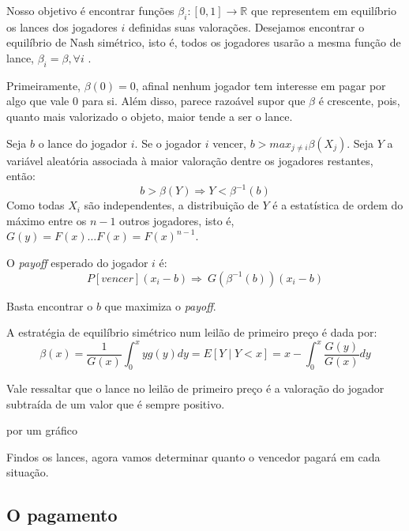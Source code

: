 Nosso objetivo é encontrar funções $\beta_i : [0, 1] \xrightarrow{} \mathbb{R}$ que representem em equilíbrio os lances dos jogadores $i$ definidas suas valorações. Desejamos encontrar o equilíbrio de Nash simétrico, isto é, todos os jogadores usarão a mesma função de lance, $\beta_i = \beta, \forall i$ \citet{krishna}.

Primeiramente, $\beta(0) = 0$, afinal nenhum jogador tem interesse em pagar por algo que vale 0 para si. Além disso, parece razoável supor que $\beta$ é crescente, pois, quanto mais valorizado o objeto, maior tende a ser o lance.

Seja $b$ o lance do jogador $i$. Se o jogador $i$ vencer, $b > max_{j \ne i} \beta(X_j)$. Seja $Y$ a variável aleatória associada à maior valoração dentre os jogadores restantes, então:
\begin{equation}
b > \beta(Y) \Rightarrow Y < \beta^{-1}(b)    
\end{equation}
Como todas $X_i$ são independentes, a distribuição de $Y$ é a estatística de ordem do máximo entre os $n-1$ outros jogadores, isto é, $G(y) = F(x) \ldots F(x) = F(x)^{n-1}$.

O \emph{payoff} esperado do jogador $i$ é:
\begin{equation}
    P[vencer] (x_i - b) \Rightarrow \
    G(\beta^{-1}(b)) (x_i - b)
\end{equation}

Basta encontrar o $b$ que maximiza o \emph{payoff}.

\begin{proposicao}
    \label{prop:nash-primeiro-preco}
    A estratégia de equilíbrio simétrico num leilão de primeiro preço é dada por:
    \begin{equation}
        \beta(x) = \frac{1}{G(x)} \int_{0}^{x} yg(y)dy = E\left[ Y \mid Y<x \right] = x - \int_{0}^{x} \frac{G(y)}{G(x)}dy
    \end{equation}
\end{proposicao}

Vale ressaltar que o lance no leilão de primeiro preço é a valoração do jogador subtraída de um valor que é sempre positivo.

{ \huge por um gráfico }

Findos os lances, agora vamos determinar quanto o vencedor pagará em cada situação.

\subsection{O pagamento}

